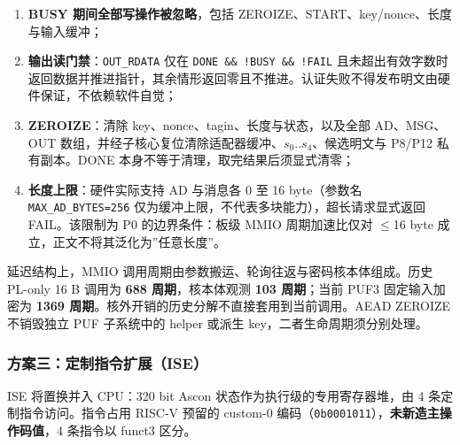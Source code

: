 \begin{enumerate}
\def\labelenumi{\arabic{enumi}.}
\tightlist
\item
  \textbf{BUSY 期间全部写操作被忽略}，包括 ZEROIZE、START、key/nonce、长度与输入缓冲；
\item
  \textbf{输出读门禁}：\texttt{OUT\_\allowbreak{}RDATA} 仅在 \texttt{DONE\ \&\&\ !BUSY\ \&\&\ !FAIL} 且未超出有效字数时返回数据并推进指针，其余情形返回零且不推进。认证失败不得发布明文由硬件保证，不依赖软件自觉；
\item
  \textbf{ZEROIZE}：清除 key、nonce、tagin、长度与状态，以及全部 AD、MSG、OUT 数组，并经子核心复位清除适配器缓冲、\(s_0..s_4\)、候选明文与 P8/P12 私有副本。DONE 本身不等于清理，取完结果后须显式清零；
\item
  \textbf{长度上限}：硬件实际支持 AD 与消息各 0 至 16 byte（参数名 \texttt{MAX\_\allowbreak{}AD\_\allowbreak{}BYTES=256} 仅为缓冲上限，不代表多块能力），超长请求显式返回 FAIL。该限制为 P0 的边界条件：板级 MMIO 周期加速比仅对 $\leq$16 byte 成立，正文不将其泛化为''任意长度''。
\end{enumerate}

延迟结构上，MMIO 调用周期由参数搬运、轮询往返与密码核本体组成。历史 PL-only 16 B 调用为 \textbf{688 周期}，核本体观测 \textbf{103 周期}；当前 PUF3 固定输入加密为 \textbf{1369 周期}。核外开销的历史分解不直接套用到当前调用。AEAD ZEROIZE 不销毁独立 PUF 子系统中的 helper 或派生 key，二者生命周期须分别处理。

\Needspace{85pt}

\subsubsection{方案三：定制指令扩展（ISE）}\label{ux65b9ux6848ux4e09ux5b9aux5236ux6307ux4ee4ux6269ux5c55ise}

ISE 将置换并入 CPU：320 bit Ascon 状态作为执行级的专用寄存器堆，由 4 条定制指令访问。指令占用 RISC-V 预留的 custom-0 编码（\texttt{0b0001011}），\textbf{未新造主操作码值}，4 条指令以 funct3 区分。


